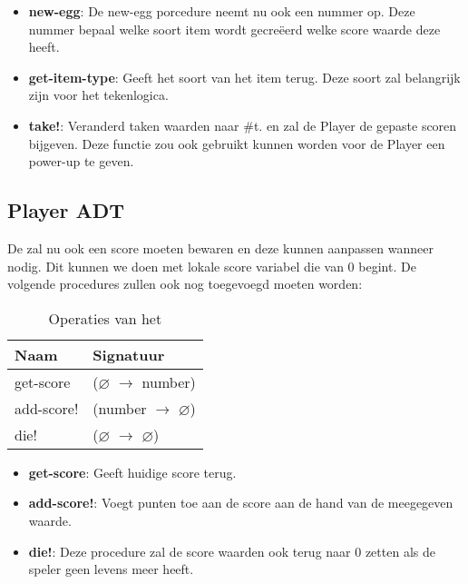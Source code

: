 \begin{itemize}
	\item \textbf{new-egg}: De new-egg porcedure neemt nu ook een nummer op.
		Deze nummer bepaal welke soort item wordt gecreëerd
		welke score waarde deze heeft.
	\item \textbf{get-item-type}: Geeft het soort van het item terug.
		Deze soort zal belangrijk zijn voor het tekenlogica.
	\item \textbf{take!}: Veranderd taken waarden naar \#t.
		en zal de Player de gepaste scoren bijgeven.
		Deze functie zou ook gebruikt kunnen worden voor de Player een power-up te geven.
\end{itemize}

\subsection{Player ADT}
\label{section:player}
De \texttt{} zal nu ook een score moeten bewaren
en deze kunnen aanpassen wanneer nodig.
Dit kunnen we doen met lokale score variabel die van 0 begint.
De volgende procedures zullen ook nog toegevoegd moeten worden:

\begin{table}[hbt]
\centering
\begin{tabular}{|ll|}
\hline
\rowcolor[HTML]{000000} 
{\color[HTML]{FFFFFF} \textbf{Naam}} & {\color[HTML]{FFFFFF} \textbf{Signatuur}} \\ \hline
get-score  & ($\varnothing$ $\rightarrow$ number)                        \\ \hline
add-score! & (number $\rightarrow$ $\varnothing$)                        \\ \hline
die!          & ($\varnothing$ $\rightarrow$ $\varnothing$)                   \\ \hline
\end{tabular}
\caption{Operaties van het \texttt{}}
\label{table:ant}
\end{table}

\begin{itemize}
	\item \textbf{get-score}: Geeft huidige score terug.
	\item \textbf{add-score!}: Voegt punten toe aan de score aan de hand van de meegegeven waarde.
	\item \textbf{die!}: Deze procedure zal de score waarden ook terug naar 0 zetten als de speler geen levens meer heeft.
\end{itemize}

